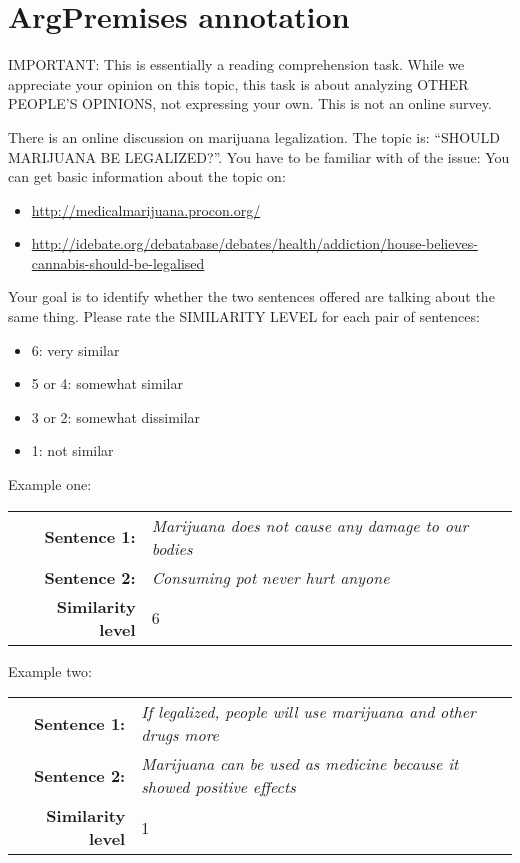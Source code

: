 \section{ArgPremises annotation}
\label{sec:argpremises_annotation}


IMPORTANT: This is essentially a reading comprehension task. While we
appreciate your opinion on this topic, this task is about analyzing OTHER
PEOPLE'S OPINIONS, not expressing your own. This is not an online survey.

\noindent There is an online discussion on marijuana legalization. The topic is: ``SHOULD
MARIJUANA BE LEGALIZED?''. You have to be familiar with of the issue: You can
get basic information about the topic on: 
\begin{itemize}
\item \url{http://medicalmarijuana.procon.org/}
\item \url{http://idebate.org/debatabase/debates/health/addiction/house-believes-cannabis-should-be-legalised}
\end{itemize}
Your goal is to identify whether the two sentences offered are talking about
the same thing. Please rate the SIMILARITY LEVEL for each pair of sentences:
\begin{itemize}
\item 6: very similar
\item 5 or 4: somewhat similar
\item 3 or 2: somewhat dissimilar
\item 1: not similar
\end{itemize}

\noindent Example one: \\
\begin{tabular}{|@{\ }r@{\ \  }p{}|}
\hline
\textbf{Sentence 1:} & \emph{Marijuana does not cause any damage to our bodies}\\
\textbf{Sentence 2:} & \emph{Consuming pot never hurt anyone}\\
\textbf{Similarity level} & 6 \\
\hline
\end{tabular}

\noindent Example two: \\
\begin{tabular}{|@{\ }r@{\ \  }p{}|}
\hline
\textbf{Sentence 1:} & \emph{If legalized, people will use marijuana and other drugs more}\\
\textbf{Sentence 2:} & \emph{Marijuana can be used as medicine because it showed positive effects}\\
\textbf{Similarity level} & 1 \\
\hline
\end{tabular}

